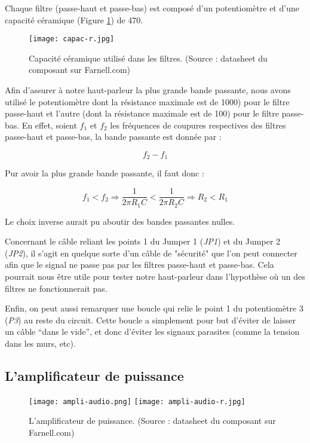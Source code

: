 Chaque filtre (passe-haut et passe-bas) est composé d'un potentiomètre et d'une capacité céramique
(Figure \ref{capac-r}) de \unit{470}{\nano\farad}.

\begin{figure}[!htb]
	\centering
	\texttt{[image: capac-r.jpg]}
	\caption{Capacité céramique utilisé dans les filtres. (Source : datasheet du composant sur Farnell.com)}
	\label{capac-r}
\end{figure}

Afin d'assurer à notre haut-parleur la plus grande bande passante, nous avons utilisé le potentiomètre
dont la résistance maximale est de \unit{1000}{\ohm}) pour le filtre passe-haut et
l'autre (dont la résistance maximale est de \unit{100}{\ohm}) pour le filtre passe-bas. En effet, soient
$f_1$ et $f_2$ les fréquences de coupures respectives des filtres passe-haut et passe-bas, la bande passante
est donnée par :

$$f_2 - f_1$$

Pur avoir la plus grande bande passante, il faut donc :

$$f_1 < f_2 \Rightarrow \frac{1}{2\pi R_1C} < \frac{1}{2\pi R_2C} \Rightarrow R_2 < R_1$$

Le choix inverse aurait pu aboutir des bandes passantes nulles.

Concernant le câble reliant les points 1 du Jumper 1 (\textit{JP1}) et du Jumper 2 (\textit{JP2}), 
il s'agit en quelque sorte d'un câble de "sécurité" que l'on peut connecter afin que le signal 
ne passe pas par les filtres passe-haut et passe-bas. 
Cela pourrait nous être utile pour tester notre haut-parleur dans l'hypothèse où un des filtres 
ne fonctionnerait pas.

Enfin, on peut aussi remarquer une boucle qui relie le point 1 du potentiomètre 3 (\textit{P3})
au reste du circuit. Cette boucle a simplement pour but d'éviter de laisser un câble "`dans le vide"',
et donc d'éviter les signaux parasites (comme la tension dans les murs, etc).

\subsection{L'amplificateur de puissance}

\begin{figure}[!htb]
	\centering
	\texttt{[image: ampli-audio.png]}
	\texttt{[image: ampli-audio-r.jpg]}
	\caption{L'amplificateur de puissance. (Source : datasheet du composant sur Farnell.com)}
	\label{ampli-audio}
\end{figure}

